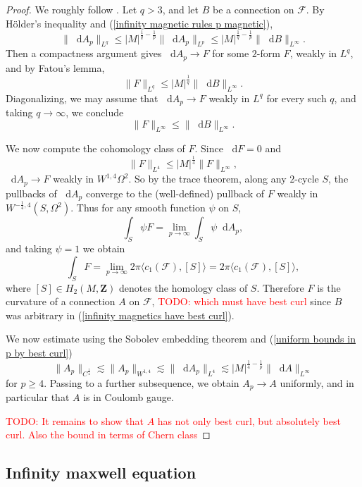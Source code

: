 \documentclass[reqno,11pt]{amsart}
\newcommand{\ZZ}{\mathbf{Z}}
\newcommand*\dif{\mathop{}\!\mathrm{d}}
\theoremstyle{definition}
\numberwithin{equation}{section}
\newcommand\todo[1]{\textcolor{red}{TODO: #1}}
\begin{document}
\begin{proof}
We roughly follow \cite[\S3]{Lindqvist14}.
Let $q > 3$, and let $B$ be a connection on $\mathscr F$.
By H\"older's inequality and (\ref{infinity magnetic rules p magnetic}),
\begin{equation}\label{uniform bounds in p by best curl}
	\|\dif A_p\|_{L^q} \leq |M|^{\frac{1}{q} - \frac{1}{p}} \|\dif A_p\|_{L^p} \leq |M|^{\frac{1}{q} - \frac{1}{p}} \|\dif B\|_{L^\infty}.
\end{equation}
Then a compactness argument gives $\dif A_p \to F$ for some $2$-form $F$, weakly in $L^q$, and by Fatou's lemma, 
$$\|F\|_{L^q} \leq |M|^{\frac{1}{q}} \|\dif B\|_{L^\infty}.$$
Diagonalizing, we may assume that $\dif A_p \to F$ weakly in $L^q$ for every such $q$, and taking $q \to \infty$, we conclude 
\begin{equation}\label{infinity magnetics have best curl}
	\|F\|_{L^\infty} \leq \|\dif B\|_{L^\infty}.
\end{equation}

We now compute the cohomology class of $F$.
Since $\dif F = 0$ and
$$\|F\|_{L^4} \leq |M|^{\frac{1}{4}} \|F\|_{L^\infty},$$
$\dif A_p \to F$ weakly in $W^{1, 4} \Omega^2$.
So by the trace theorem, along any $2$-cycle $S$, the pullbacks of $\dif A_p$ converge to the (well-defined) pullback of $F$ weakly in $W^{-\frac{1}{4}, 4}(S, \Omega^2)$.
Thus for any smooth function $\psi$ on $S$,
$$\int_S \psi F = \lim_{p \to \infty} \int_S \psi \dif A_p,$$
and taking $\psi = 1$ we obtain 
$$\int_S F = \lim_{p \to \infty} 2\pi \langle c_1(\mathscr F), [S] \rangle = 2\pi \langle c_1(\mathscr F), [S]\rangle,$$
where $[S] \in H_2(M, \ZZ)$ denotes the homology class of $S$.
Therefore $F$ is the curvature of a connection $A$ on $\mathscr F$, \todo{which must have best curl} since $B$ was arbitrary in (\ref{infinity magnetics have best curl}).

We now estimate using the Sobolev embedding theorem and (\ref{uniform bounds in p by best curl})
$$\|A_p\|_{C^{\frac{1}{4}}} \lesssim \|A_p\|_{W^{1, 4}} \lesssim \|\dif A_p\|_{L^4} \lesssim |M|^{\frac{1}{4} - \frac{1}{p}} \|\dif A\|_{L^\infty}$$
for $p \geq 4$.
Passing to a further subsequence, we obtain $A_p \to A$ uniformly, and in particular that $A$ is in Coulomb gauge.

\todo{It remains to show that $A$ has not only best curl, but absolutely best curl. Also the bound in terms of Chern class}
\end{proof}

\subsection{Infinity maxwell equation}
\end{document}
